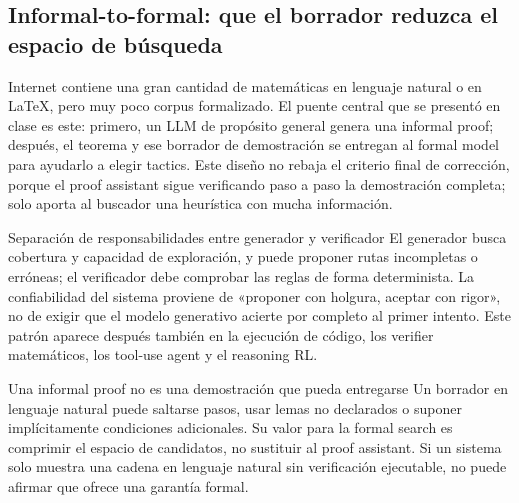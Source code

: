 \subsection{Informal-to-formal: que el borrador reduzca el espacio de búsqueda}

Internet contiene una gran cantidad de matemáticas en lenguaje natural o en \LaTeX{}, pero muy poco corpus formalizado. El puente central que se presentó en clase es este: primero, un LLM de propósito general genera una informal proof; después, el teorema y ese borrador de demostración se entregan al formal model para ayudarlo a elegir tactics. Este diseño no rebaja el criterio final de corrección, porque el proof assistant sigue verificando paso a paso la demostración completa; solo aporta al buscador una heurística con mucha información.


\begin{importantbox}{Separación de responsabilidades entre generador y verificador}
El generador busca cobertura y capacidad de exploración, y puede proponer rutas incompletas o erróneas; el verificador debe comprobar las reglas de forma determinista. La confiabilidad del sistema proviene de «proponer con holgura, aceptar con rigor», no de exigir que el modelo generativo acierte por completo al primer intento. Este patrón aparece después también en la ejecución de código, los verifier matemáticos, los tool-use agent y el reasoning RL.
\end{importantbox}

\begin{warningbox}{Una informal proof no es una demostración que pueda entregarse}
Un borrador en lenguaje natural puede saltarse pasos, usar lemas no declarados o suponer implícitamente condiciones adicionales. Su valor para la formal search es comprimir el espacio de candidatos, no sustituir al proof assistant. Si un sistema solo muestra una cadena en lenguaje natural sin verificación ejecutable, no puede afirmar que ofrece una garantía formal.
\end{warningbox}


